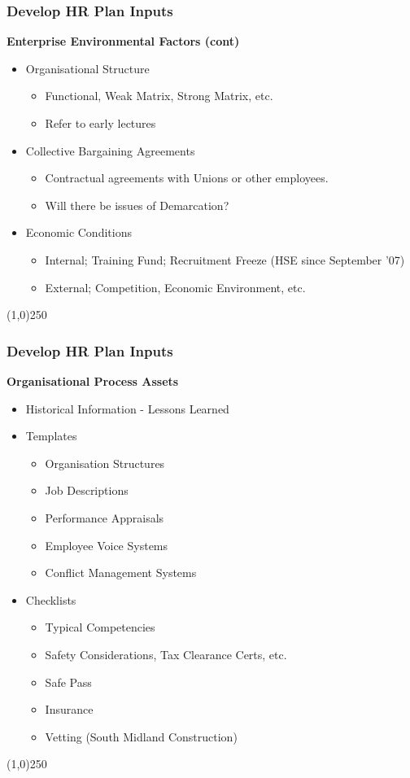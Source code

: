  
\begin{frame}
\frametitle{Develop HR Plan \hfill\hfill Inputs}
\textbf{Enterprise Environmental Factors (cont)}
\begin{itemize}
	\item Organisational Structure
	\begin{itemize}
		\item Functional, Weak Matrix, Strong Matrix, etc.
		\item Refer to early lectures  
	\end{itemize}
	\item Collective Bargaining Agreements
	\begin{itemize}
		\item Contractual agreements with Unions or other employees.
		\item Will there be issues of Demarcation?
	\end{itemize}
	\item Economic Conditions
	\begin{itemize}
		\item Internal; Training Fund; Recruitment Freeze (HSE since September '07)
		\item External; Competition, Economic Environment, etc.
	\end{itemize}
\end{itemize}
\end{frame}\begin{center}\line(1,0){250}\end{center}
 
 
\begin{frame}
\frametitle{Develop HR Plan \hfill Inputs}
\textbf{Organisational Process Assets}
\begin{itemize}
	\item Historical Information - Lessons Learned
	\item Templates
	\begin{itemize}
		\item Organisation Structures 
		\item Job Descriptions
		\item Performance Appraisals 
		\item Employee Voice Systems
		\item Conflict Management Systems
	\end{itemize}
	\item Checklists
	\begin{itemize}
		\item Typical Competencies
		\item Safety Considerations, Tax Clearance Certs, etc.
		\item Safe Pass
		\item Insurance
		\item Vetting (South Midland Construction)
	\end{itemize}
\end{itemize}
\end{frame}\begin{center}\line(1,0){250}\end{center}
 
